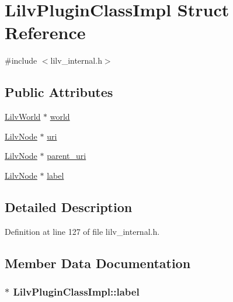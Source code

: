 \hypertarget{struct_lilv_plugin_class_impl}{}\section{Lilv\+Plugin\+Class\+Impl Struct Reference}
\label{struct_lilv_plugin_class_impl}


{\ttfamily \#include $<$lilv\+\_\+internal.\+h$>$}

\subsection*{Public Attributes}
\begin{DoxyCompactItemize}
\item 
\hyperlink{lilv_8h_a91c1745aa6ffca2b6b87c56df6c5ab86}{Lilv\+World} $\ast$ \hyperlink{struct_lilv_plugin_class_impl_aa08577f35010adbaaa893053cfe72dc9}{world}
\item 
\hyperlink{lilv_8h_ae183dca3dca5368d34dbd863a405437b}{Lilv\+Node} $\ast$ \hyperlink{struct_lilv_plugin_class_impl_ac1c96a07b2e84e51725d4d9c91d64139}{uri}
\item 
\hyperlink{lilv_8h_ae183dca3dca5368d34dbd863a405437b}{Lilv\+Node} $\ast$ \hyperlink{struct_lilv_plugin_class_impl_a612ae6206ff8bd62119351d0544795d8}{parent\+\_\+uri}
\item 
\hyperlink{lilv_8h_ae183dca3dca5368d34dbd863a405437b}{Lilv\+Node} $\ast$ \hyperlink{struct_lilv_plugin_class_impl_a4c2287d5a65071022a7f538b42e3dd05}{label}
\end{DoxyCompactItemize}


\subsection{Detailed Description}


Definition at line 127 of file lilv\+\_\+internal.\+h.



\subsection{Member Data Documentation}
\subsubsection[{\texorpdfstring{label}{label}}]{$\ast$ Lilv\+Plugin\+Class\+Impl\+::label}\hypertarget{struct_lilv_plugin_class_impl_a4c2287d5a65071022a7f538b42e3dd05}{}\label{struct_lilv_plugin_class_impl_a4c2287d5a65071022a7f538b42e3dd05}


